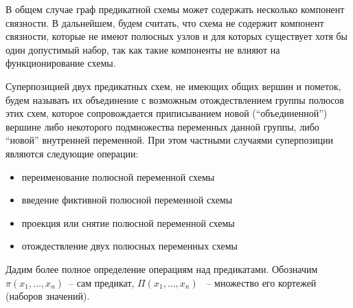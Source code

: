 \documentclass[12pt]{article}
\begin{document}
В общем случае граф предикатной схемы может содержать несколько компонент связности. 
В дальнейшем, будем считать, что схема не содержит компонент связности, 
которые не имеют полюсных узлов и для которых существует хотя бы один допустимый набор, так как такие компоненты не влияют на функционирование схемы.

Суперпозицией двух предикатных схем, не имеющих общих вершин и пометок, 
будем называть их объединение с возможным отождествлением группы полюсов этих схем, 
которое сопровождается приписыванием новой (``объединенной'') вершине либо 
некоторого подмножества переменных данной группы, либо ``новой'' внутренней переменной.
 При этом частными случаями суперпозиции являются следующие операции:
\begin{itemize}
\item переименование полюсной переменной схемы

\item введение фиктивной полюсной переменной схемы

\item проекция или снятие полюсной переменной схемы

\item отождествление двух полюсных переменных схемы
\end{itemize}

Дадим более полное определение операциям над предикатами.
Обозначим $\pi(x_1, \dots, x_n)$~-- сам предикат, $\Pi(x_1, \dots, x_n)$ ~-- множество его кортежей (наборов значений).
\end{document}
